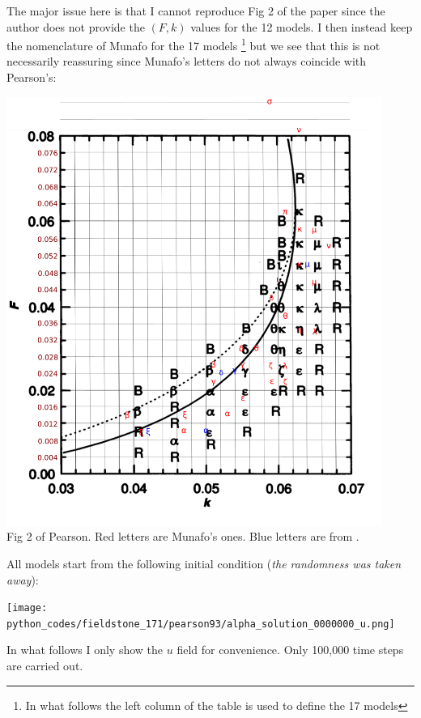 The major issue here is that I cannot reproduce Fig 2 of the paper since the 
author does not provide the $(F,k)$ values for the 12 models. 
I then instead keep the nomenclature of Munafo for the 17 models
\footnote{In what follows the left column of the table is used to define the 17 
models} but we see that this is not necessarily reassuring since Munafo's letters 
do not always coincide with Pearson's:
\begin{center}
\includegraphics[height=14cm]{python_codes/fieldstone_171/images/drawing.png}\\
{\captionfont Fig 2 of Pearson. Red letters are Munafo's ones. 
Blue letters are from \cite{gane22}.}
\end{center}




All models start from the following initial condition ({\it the randomness was taken away}):
\begin{center}
\texttt{[image: python\_codes/fieldstone\_171/pearson93/alpha\_solution\_0000000\_u.png]}
\end{center}

In what follows I only show the $u$ field for convenience.
Only 100,000 time steps are carried out.

